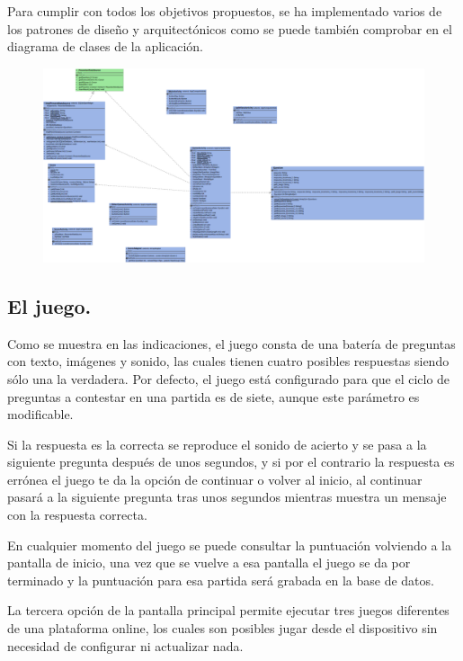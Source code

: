 \documentclass[10pt]{article}
\begin{document}
Para cumplir con todos los objetivos propuestos, se ha implementado varios de los patrones de diseño y arquitectónicos como se puede también comprobar en el diagrama de clases de la aplicación.

\begin{figure}[H]
	\begin{center}
 		\includegraphics[width = 1.05\textwidth]{Imagenes/diagramaClases.eps}
	\end{center} 
\end{figure}


\subsection{El juego.}

Como se muestra en las indicaciones, el juego consta de una batería de preguntas con texto, imágenes y sonido, las cuales tienen cuatro posibles respuestas siendo sólo una la verdadera. Por defecto, el juego está configurado para que el ciclo de preguntas a contestar en una partida es de siete, aunque este parámetro es modificable.

Si la respuesta es la correcta se reproduce el sonido de acierto y se pasa a la siguiente pregunta después de unos segundos, y si por el contrario la respuesta es errónea el juego te da la opción de continuar o volver al inicio, al continuar pasará a la siguiente pregunta tras unos segundos mientras muestra un mensaje con la respuesta correcta.

En cualquier momento del juego se puede consultar la puntuación volviendo a la pantalla de inicio, una vez que se vuelve a esa pantalla el juego se da por terminado y la puntuación para esa partida será grabada en la base de datos.

La tercera opción de la pantalla principal permite ejecutar tres juegos diferentes de una plataforma online, los cuales son posibles jugar desde el dispositivo sin necesidad de configurar ni actualizar nada.
\end{document}
